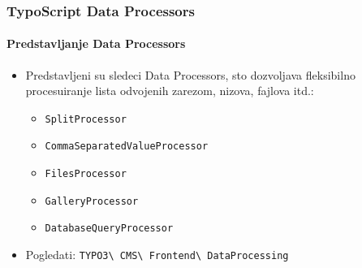 \begin{frame}[fragile]
	\frametitle{TypoScript Data Processors}
	\framesubtitle{Predstavljanje Data Processors}

	\lstset{basicstyle=\tiny\ttfamily}

	\begin{itemize}

		\item Predstavljeni su sledeci Data Processors, sto dozvoljava fleksibilno procesuiranje lista odvojenih zarezom, nizova, fajlova itd.:

			\begin{itemize}
				\item \texttt{SplitProcessor}
				\item \texttt{CommaSeparatedValueProcessor}
				\item \texttt{FilesProcessor}
				\item \texttt{GalleryProcessor}
				\item \texttt{DatabaseQueryProcessor}
			\end{itemize}

		\item Pogledati:
			\texttt{TYPO3\textbackslash
				CMS\textbackslash
				Frontend\textbackslash
				DataProcessing}

	\end{itemize}

\end{frame}


